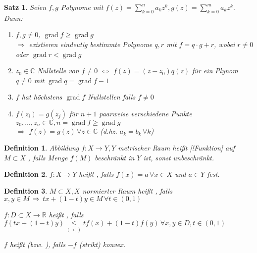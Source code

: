 \documentclass[ngerman,a4paper]{report}
\theoremstyle{break}
\newtheorem{satz}[theorem]{Satz}
\newtheorem*{definition}{Definition}
\DeclareMathOperator{\grad}{grad}
\begin{document}
\begin{satz}\label{Polynomdiv}
	Seien $f,g$ Polynome mit $f(z) = \sum_{k=0}^n a_k z^k, g(z) = \sum_{k=0}^m a_k z^k$. Dann:
	\begin{enumerate}[label={\arabic*)}]
		\item $f,g\neq 0$, $\grad f\ge \grad g$\\
		$\Rightarrow$ existieren eindeutig bestimmte Polynome $q,r$ mit $f = q\cdot g + r$, wobei $r\neq 0$ oder $\grad r < \grad g$
		\item $z_0\in\mathbb{C}$ Nullstelle von $f\neq 0$ $\Leftrightarrow$ $f(z) = (z - z_0)q(z)$ für ein Plynom $q\neq 0$ mit $\grad q = \grad f -1$
		\item $f$ hat höchstens $\grad f$ Nullstellen falls $f\neq 0$
		\item $f(z_i) = g(z_j)$ für $n+1$ paarweise verschiedene Punkte $z_0, \dotsc, z_n\in\mathbb{C}, n = \grad f \ge \grad g$\\
		$\Rightarrow$ $f(z) = g(z) \,\forall z\in\mathbb{C}$ (d.hz. $a_k = b_k\,\forall k$)
	\end{enumerate}
\end{satz}
\begin{definition}
	Abbildung $f:X\rightarrow Y, Y$ metrischer Raum heißt [!Funktion] auf $M\subset X$ , falls Menge $f(M)$ beschränkt in $Y$ ist, sonst unbeschränkt.
\end{definition}
\begin{definition}
	$f:X\to Y$ heißt , falls $f(x) = a\,\forall x\in X$ und $a\in Y$ fest.
\end{definition}
\begin{definition}
	$M\subset X, X$ normierter Raum heißt , falls $x,y\in M \,\Rightarrow \,tx+(1-t)y \in M\,\forall t\in(0,1)$
	
	$f:D\subset X\to \mathbb{R}$ heißt , falls $f(tx + (1-t)y) \underset{(<)}{\le} t f(x) + (1-t)f(y)\,\forall x,y\in D, t\in(0,1)$
	
	$f$ heißt  (bzw. ), falls $-f$ (strikt) konvex.
\end{definition}
\end{document}
